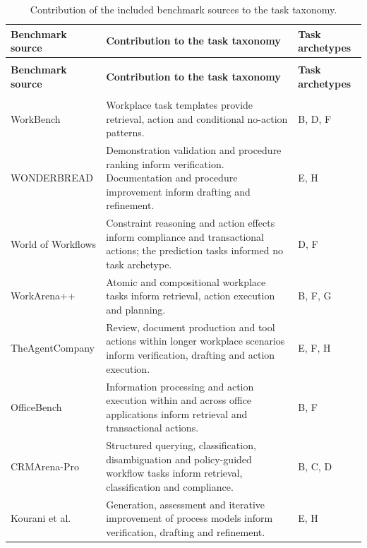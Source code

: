 \begin{longtable}{>{\raggedright\arraybackslash}p{} >{\raggedright\arraybackslash}p{} >{\raggedright\arraybackslash}p{}}
\caption[Contribution of the included benchmark sources to the task taxonomy]{Contribution of the included benchmark sources to the task taxonomy.}\label{tab:app-mapping} \\
\toprule
\textbf{Benchmark source} & \textbf{Contribution to the task taxonomy} & \textbf{Task arche\-types} \\
\midrule
\endfirsthead
\multicolumn{3}{l}{\tablename~\thetable{} (continued)} \\
\toprule
\textbf{Benchmark source} & \textbf{Contribution to the task taxonomy} & \textbf{Task arche\-types} \\
\midrule
\endhead
\midrule
\multicolumn{3}{r}{\emph{Continued on the next page.}} \\
\endfoot
\bottomrule
\endlastfoot
WorkBench & Workplace task templates provide retrieval, action and conditional no-action patterns. & B, D, F \\
\addlinespace[2.5pt]
WONDERBREAD & Demonstration validation and procedure ranking inform verification. Documentation and procedure improvement inform drafting and refinement. & E, H \\
\addlinespace[2.5pt]
World of Workflows & Constraint reasoning and action effects inform compliance and transactional actions; the prediction tasks informed no task archetype. & D, F \\
\addlinespace[2.5pt]
WorkArena++ & Atomic and compositional workplace tasks inform retrieval, action execution and planning. & B, F, G \\
\addlinespace[2.5pt]
TheAgentCompany & Review, document production and tool actions within longer workplace scenarios inform verification, drafting and action execution. & E, F, H \\
\addlinespace[2.5pt]
OfficeBench & Information processing and action execution within and across office applications inform retrieval and transactional actions. & B, F \\
\addlinespace[2.5pt]
CRMArena-Pro & Structured querying, classification, disambiguation and policy-guided workflow tasks inform retrieval, classification and compliance. & B, C, D \\
\addlinespace[2.5pt]
Kourani et al. & Generation, assessment and iterative improvement of process models inform verification, drafting and refinement. & E, H \\

\end{longtable}
